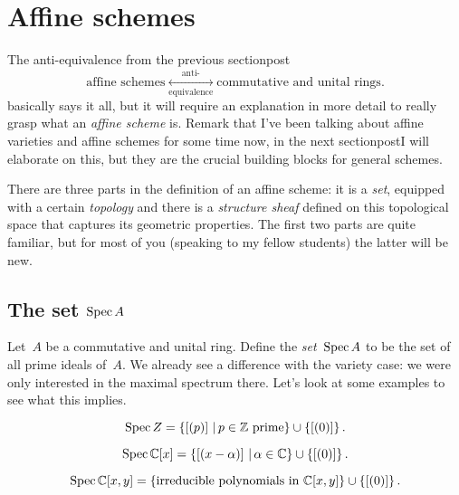 \section{Affine schemes}
The anti-equivalence from the previous \iftex section\fi\ifblog post\fi
\begin{equation}
  \text{affine schemes} \underset{\text{equivalence}}{\overset{\text{anti-}}{\longleftrightarrow}} \text{commutative and unital rings}.
  \label{equation:schemes-anti-equivalence-2}
\end{equation}
basically says it all, but it will require an explanation in more detail to really grasp what an \emph{affine scheme} is. Remark that I've been talking about affine varieties and affine schemes for some time now, in the next \iftex section\fi\ifblog post\fi I will elaborate on this, but they are the crucial building blocks for general schemes.

There are three parts in the definition of an affine scheme: it is a \emph{set}, equipped with a certain \emph{topology} and there is a \emph{structure sheaf} defined on this topological space that captures its geometric properties. The first two parts are quite familiar, but for most of you (speaking to my fellow students) the latter will be new.

\subsection{The set $\operatorname{Spec} A$}
Let~$A$ be a commutative and unital ring. Define the \emph{set~$\operatorname{Spec} A$} to be the set of all prime ideals of~$A$. We already see a difference with the variety case: we were only interested in the maximal spectrum there. Let's look at some examples to see what this implies.

\begin{example}
  \begin{equation}
    \operatorname{Spec} Z=\left\{ \left[ (p) \right]\,|\,\text{$p\in\mathbb{Z}$ prime} \right\}\cup\left\{ [(0)] \right\}.
  \end{equation}
\end{example}

\begin{example}
  \begin{equation}
    \operatorname{Spec}\mathbb{C}[x]=\left\{ \left[ (x-\alpha) \right]\,|\,\alpha\in\mathbb{C} \right\}\cup\left\{ [(0)] \right\}.
  \end{equation}
\end{example}

\begin{example}
  \begin{equation}
    \operatorname{Spec}\mathbb{C}[x,y]=\left\{ \text{irreducible polynomials in~$\mathbb{C}[x,y]$} \right\}\cup\left\{ [(0)] \right\}.
  \end{equation}
\end{example}

